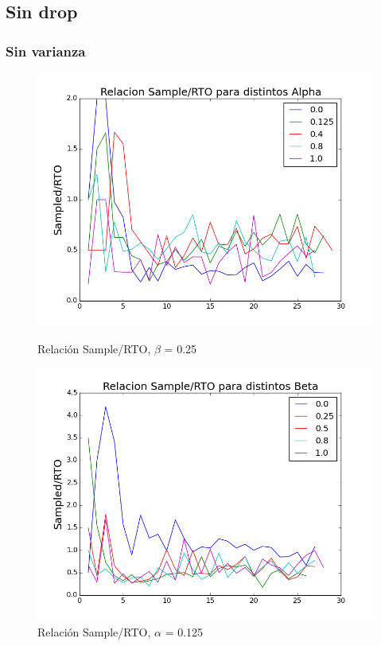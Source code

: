 \subsection{Sin drop}

\subsubsection{Sin varianza}

\begin{figure}[H]
\begin{minipage}{0.5\linewidth}
\includegraphics[width=\linewidth]{../src/alphavar0.png}
\caption{Relación Sample/RTO, $\beta$ = 0.25}\label{fig:alpha-var0-nodrop}
\end{minipage}
\hfill
\begin{minipage}{0.5\linewidth}
\includegraphics[width=\linewidth]{../src/betavar0.png}
\caption{Relación Sample/RTO, $\alpha$ = 0.125}\label{fig:beta-var0-nodrop}
\end{minipage}
\end{figure}

